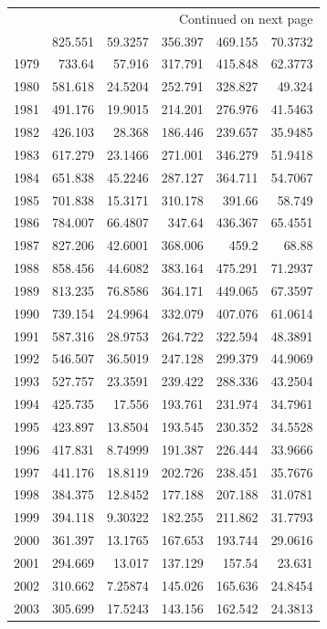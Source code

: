 \documentclass[a4paper]{article}
\begin{document}
\begin{longtable}{rrrrrr}
\hline
\endhead
\hline\multicolumn{6}{r}{Continued on next page} \\
\endfoot
\endlastfoot
\hline
1978 & 825.551 & 59.3257 & 356.397 & 469.155 & 70.3732\\
1979 & 733.64 & 57.916 & 317.791 & 415.848 & 62.3773\\
1980 & 581.618 & 24.5204 & 252.791 & 328.827 & 49.324\\
1981 & 491.176 & 19.9015 & 214.201 & 276.976 & 41.5463\\
1982 & 426.103 & 28.368 & 186.446 & 239.657 & 35.9485\\
1983 & 617.279 & 23.1466 & 271.001 & 346.279 & 51.9418\\
1984 & 651.838 & 45.2246 & 287.127 & 364.711 & 54.7067\\
1985 & 701.838 & 15.3171 & 310.178 & 391.66 & 58.749\\
1986 & 784.007 & 66.4807 & 347.64 & 436.367 & 65.4551\\
1987 & 827.206 & 42.6001 & 368.006 & 459.2 & 68.88\\
1988 & 858.456 & 44.6082 & 383.164 & 475.291 & 71.2937\\
1989 & 813.235 & 76.8586 & 364.171 & 449.065 & 67.3597\\
1990 & 739.154 & 24.9964 & 332.079 & 407.076 & 61.0614\\
1991 & 587.316 & 28.9753 & 264.722 & 322.594 & 48.3891\\
1992 & 546.507 & 36.5019 & 247.128 & 299.379 & 44.9069\\
1993 & 527.757 & 23.3591 & 239.422 & 288.336 & 43.2504\\
1994 & 425.735 & 17.556 & 193.761 & 231.974 & 34.7961\\
1995 & 423.897 & 13.8504 & 193.545 & 230.352 & 34.5528\\
1996 & 417.831 & 8.74999 & 191.387 & 226.444 & 33.9666\\
1997 & 441.176 & 18.8119 & 202.726 & 238.451 & 35.7676\\
1998 & 384.375 & 12.8452 & 177.188 & 207.188 & 31.0781\\
1999 & 394.118 & 9.30322 & 182.255 & 211.862 & 31.7793\\
2000 & 361.397 & 13.1765 & 167.653 & 193.744 & 29.0616\\
2001 & 294.669 & 13.017 & 137.129 & 157.54 & 23.631\\
2002 & 310.662 & 7.25874 & 145.026 & 165.636 & 24.8454\\
2003 & 305.699 & 17.5243 & 143.156 & 162.542 & 24.3813\\

\end{longtable}
\end{document}
